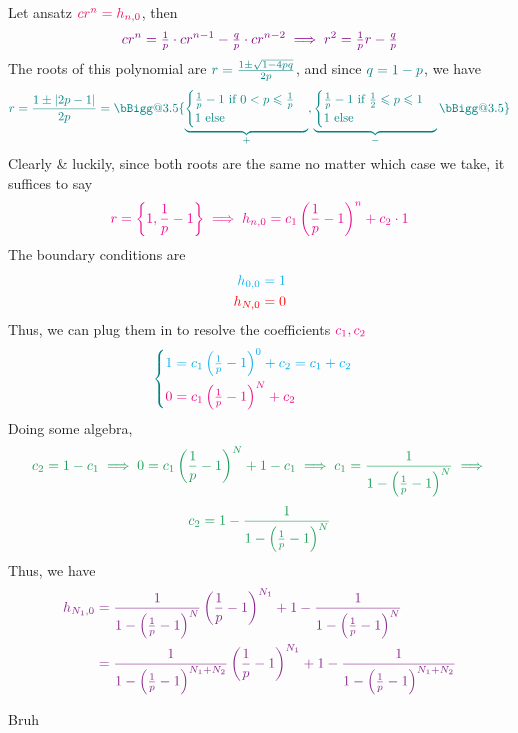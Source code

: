 \documentclass{solutionclass}
\makeatletter
\renewcommand{\c}[1]{\color{#1}}
\newcommand{\f}[2]{\frac{#1}{#2}}
\newcommand{\tf}[2]{\tfrac{#1}{#2}}
\newcommand{\x}{\cdot}
\newcommand{\tu}[1]{\textup{#1}}
\newcommand{\Biggg}{\bBigg@{3.5}}
\makeatother
\begin{document}
\begin{enumerate}
\begin{solution}[]
Let ansatz $\c o c r^n = h_{n,0}$, then 
\[\Large \c{violet} c r^n = \tf{1}{p} \x c r^{n-1} - \tf{q}{p}\x c r^{n-2} \implies r^2 = \tf1p r - \tf{q}{p}\]
The roots of this polynomial are $\c t r = \f{1 \pm \sqrt{1-4pq}}{2p}$, and since $\c t q = 1-p$, we have \\
\[\c t  r = \f{1 \pm |2p-1|}{2p} = \Biggg\{\underbrace{\begin{cases}
\f1p - 1 \tu{ if } 0 < p \leqslant \f1p \\
1 \tu{ else }
\end{cases}}_{+}, \underbrace{\begin{cases}
\f1p - 1 \tu{ if } \f12 \leqslant p \leqslant 1 \\
1 \tu{ else }
\end{cases}}_{-}
\Biggg\}
\]
Clearly \& luckily, since both roots are the same no matter which case we take, it suffices to say
\[\c m r = \left\{1,\f1p - 1\right\} \implies h_{n,0} = c_1 \left(\f1p - 1\right)^n + c_2 \x 1\]
The boundary conditions are \begin{align*}
\c c h_{0,0} &\c c= 1 \\
\c{red} h_{N,0} &\c{red} = 0 \\
\end{align*}
Thus, we can plug them in to resolve the coefficients $\c m c_1,c_2$ \\
\[\c t \begin{cases} \c c 1 = c_1 \left(\f1p - 1\right)^0 + c_2 = c_1 + c_2 \\[6pt] \c r 0 = c_1 \left(\f1p - 1\right)^N + c_2\end{cases}\]
Doing some algebra, \[\c g c_2 = 1 - c_1 \implies 0 = c_1\left(\f1p - 1\right)^N + 1 - c_1 \implies c_1 = \f{1}{1-\left(\f1p - 1\right)^N} \implies\]
\[\c g c_2 = 1 - \f{1}{1-\left(\f1p - 1\right)^N}\]
Thus, we have \begin{align*}
\c f h_{N_1,0} &\c f= \f{1}{1-\left(\f1p - 1\right)^N} \left(\f1p - 1\right)^{N_1} + 1 - \f{1}{1-\left(\f1p - 1\right)^N} \\
&\c f= \f{1}{1-\left(\f1p - 1\right)^{N_1 + N_2}} \left(\f1p - 1\right)^{N_1} + 1 - \f{1}{1-\left(\f1p - 1\right)^{N_1 + N_2}}
\end{align*}


\end{solution}

Bruh

\end{enumerate}
\end{document}
